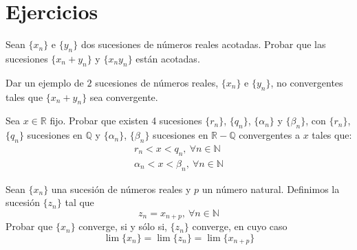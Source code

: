 \section{Ejercicios}
\begin{ejercicio}
    Sean $\{x_n\}$ e $\{y_n\}$ dos sucesiones de números reales acotadas. Probar que las sucesiones $\{x_n + y_n\}$ y $\{x_n y_n\}$ están acotadas.
\end{ejercicio}
\begin{ejercicio}
    Dar un ejemplo de $2$ sucesiones de números reales, $\{x_n\}$ e $\{y_n\}$, no convergentes tales que $\{x_n + y_n\}$ sea convergente.
\end{ejercicio}
\begin{ejercicio}
    Sea $x \in \mathbb{R}$ fijo. Probar que existen 4 sucesiones $\{r_n\}$, $\{q_n\}$, $\{\alpha_n\}$ y $\{\beta_n\}$, con  $\{r_n\}$, $\{q_n\}$ sucesiones en $\mathbb{Q}$ y $\{\alpha_n\}$, $\{\beta_n\}$ sucesiones en $\mathbb{R} - \mathbb{Q}$ convergentes a $x$ tales que:
    \begin{gather*}
        r_n < x < q_n, ~\forall n \in \mathbb{N}\\
        \alpha_n < x < \beta_n, ~\forall n \in \mathbb{N}
    \end{gather*}
\end{ejercicio}

\begin{ejercicio}\label{ej:5.4.4}
    Sean $\{x_n\}$ una sucesión de números reales y $p$ un número natural. Definimos la sucesión $\{z_n\}$ tal que
    \begin{equation*}
        z_n = x_{n+p}, ~ \forall n \in \mathbb{N}
    \end{equation*}
    Probar que $\{x_n\}$ converge, si y sólo si, $\{z_n\}$ converge, en cuyo caso
    \begin{equation*}
        \lim \{x_n\} = \lim \{z_n\} = \lim \{x_{n+p}\}
    \end{equation*}
\end{ejercicio}